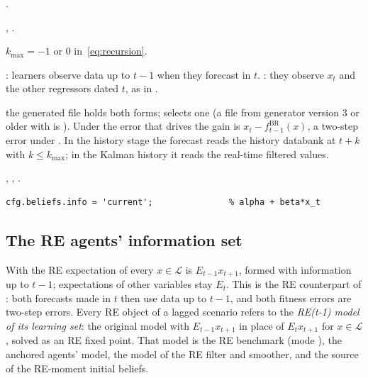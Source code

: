 \documentclass[11pt,a4paper]{article}
\DeclareRobustCommand{\codem}[1]{\texttt{\detokenize{#1}}}
\newenvironment{optspec}%
  {\begin{description}[style=sameline,leftmargin=2.7cm,labelwidth=2.5cm,font=\normalfont\itshape]}%
  {\end{description}}
\newcommand{\BR}{\mathrm{BR}}
\newcommand{\fBR}{f^{\BR}}
\begin{document}
\subsubsection{\texorpdfstring{\codem{beliefs.info}}{beliefs.info}}\label{opt:beliefs-info}
\begin{optspec}
  \item[Default] .
  \item[Values] , .
  \item[Math] $k_{\max} = -1$ or $0$ in~\eqref{eq:recursion}.
  \item[Assumptions] : learners observe data up to $t-1$ when they forecast in
        $t$. : they observe $x_t$ and the other regressors dated $t$, as in
        \citet{ozden2025}.
  \item[Interactions] the generated file holds both forms;  selects one
        (a file from generator version 3 or older with  is
        ). Under  the error that
        drives the gain is $x_t - \fBR_{t-1}(x)$, a two-step error under . In
        the history stage the forecast reads the history databank at $t+k$ with $k\le k_{\max}$;
        in the Kalman history it reads the real-time filtered values.
  \item[Code] , , .
  \item[Example]
\begin{lstlisting}
cfg.beliefs.info = 'current';               % alpha + beta*x_t
\end{lstlisting}
\end{optspec}

\subsection{The RE agents' information set}\label{sec:reinfo}

With  the RE expectation of every $x\in\mathcal{L}$ is
$E_{t-1}x_{t+1}$, formed with information up to $t-1$; expectations of other variables stay
$E_t$. This is the RE counterpart of : both forecasts made in $t$
then use data up to $t-1$, and both fitness errors are two-step errors. Every RE object of a
lagged scenario refers to the \emph{RE(t-1) model of its learning set}: the original model with
$E_{t-1}x_{t+1}$ in place of $E_t x_{t+1}$ for $x\in\mathcal{L}$, solved as an RE fixed point. That
model is the RE benchmark (mode ), the anchored agents' model, the model of the RE
filter and smoother, and the source of the RE-moment initial beliefs.
\end{document}
